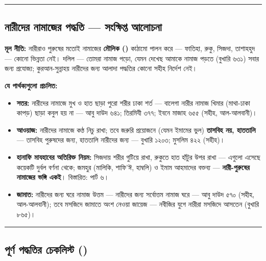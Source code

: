 \medskip\hrule\medskip

\subsection*{নারীদের নামাজের পদ্ধতি — সংক্ষিপ্ত আলোচনা}

\textbf{মূল নীতি:} নারীরাও পুরুষের মতোই নামাজের \textbf{মৌলিক ()} কাঠামো পালন করে — ফাতিহা, রুকু, সিজদা, তাশাহহুদ — কোনো ভিন্নতা নেই। দলিল — তোমরা নামাজ পড়ো, যেমন দেখেছ আমাকে নামাজ পড়তে (বুখারি ৬৩১) সবার জন্য প্রযোজ্য; কুরআন-সুন্নাহয় নারীদের জন্য আলাদা পদ্ধতির কোনো সহীহ নির্দেশ নেই।

\textbf{যে পার্থক্যগুলো প্রচলিত:}
\begin{itemize}
\item \textbf{সতর:} নারীদের নামাজে মুখ ও হাত ছাড়া পুরো শরীর ঢাকা শর্ত — বালেগা নারীর নামাজ খিমার (মাথা-ঢাকা কাপড়) ছাড়া কবুল হয় না — আবু দাউদ ৬৪১; তিরমিযী ৩৭৭; ইবনে মাজাহ ৬৫৫ (সহীহ, আল-আলবানী)।
\item \textbf{আওয়াজ:} নারীদের নামাজে কণ্ঠ নিচু রাখা; তবে জরুরি প্রয়োজনে (যেমন ইমামের ভুল) \textbf{তাসবিহ নয়, হাততালি} — তাসবিহ পুরুষদের জন্য, হাততালি নারীদের জন্য — বুখারি ১২০৩; মুসলিম ৪২২ (সহীহ)।
\item \textbf{হানাফি মাযহাবের অতিরিক্ত নিয়ম:} সিজদায় শরীর গুটিয়ে রাখা, রুকুতে হাত হাঁটুর উপর রাখা — এগুলো এসেছে কয়েকটি দুর্বল বর্ণনা থেকে; জমহুর (মালিকি, শাফি'ঈ, হাম্বলি) ও ইমাম আহমাদের বক্তব্য — \textbf{নারী-পুরুষের নামাজের ভঙ্গি একই}। বিস্তারিত: পার্ট ৬।
\item \textbf{জামাত:} নারীদের জন্য ঘরে নামাজ উত্তম — নারীদের জন্য সর্বোত্তম নামাজ ঘরে — আবু দাউদ ৫৭০ (সহীহ, আল-আলবানী); তবে মসজিদে জামাতে অংশ নেওয়া জায়েজ — নবীজির যুগে নারীরা মসজিদে আসতেন (বুখারি ৮৬৫)।
\end{itemize}
\medskip\hrule\medskip

\subsection*{পূর্ণ পদ্ধতির চেকলিস্ট ()}

